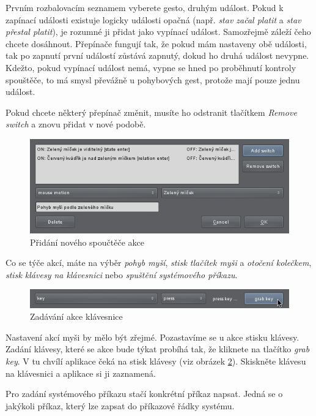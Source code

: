 Prvním rozbalovacím seznamem vyberete gesto, druhým událost. Pokud k zapínací
události existuje logicky události opačná (např. \emph{stav začal platit} a
\emph{stav přestal platit}), je rozumné ji přidat jako vypínací událost.
Samozřejmě záleží čeho chcete dosáhnout. Přepínače fungují tak, že pokud mám
nastaveny obě události, tak po zapnutí první událostí zůstává zapnutý, dokud
ho druhá událost nevypne. Kdežto, pokud vypínací událost nemá, vypne se hned
po proběhnutí kontroly spouštěče, to má smysl převážně u pohybových gest,
protože mají pouze jednu událost.

Pokud chcete některý přepínač změnit, musíte ho odstranit tlačítkem
\emph{Remove switch} a znovu přidat v nové podobě.

\begin{figure}[H]
\centering
\includegraphics[width=1.1\textwidth]{newactiontrigger.png}
\caption{Přidání nového spoučtěče akce}
\label{fig:newactiontrigger}
\end{figure}

Co se týče akcí, máte na výběr \emph{pohyb myší}, \emph{stisk tlačítek myši} a
\emph{otočení kolečkem}, \emph{stisk klávesy na klávesnici} nebo
\emph{spuštění systémového příkazu}.

\begin{figure}[H]
\centering
\includegraphics[width=1.1\textwidth]{keyaction.png}
\caption{Zadávání akce klávesnice}
\label{fig:keyaction}
\end{figure}

Nastavení akcí myši by mělo být zřejmé. Pozastavíme se u akce stisku klávesy.
Zadání klávesy, které se akce bude týkat probíhá tak, že kliknete na tlačítko
\emph{grab key}. V tu chvílí aplikace čeká na stisk klávesy (viz obrázek
\ref{fig:keyaction}). Skiskněte klávesu na klávesnici a aplikace si ji zaznamená.

Pro zadání systémového příkazu stačí konkrétní příkaz napsat. Jedná se o
jakýkoli příkaz, který lze zapsat do příkazové řádky systému.

